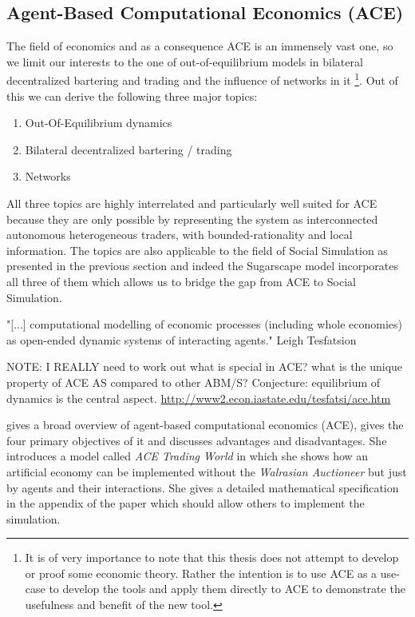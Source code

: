 \subsection{Agent-Based Computational Economics (ACE)}
The field of economics and as a consequence ACE is an immensely vast one, so we limit our interests to the one of out-of-equilibrium models in bilateral decentralized bartering and trading and the influence of networks in it \footnote{It is of very importance to note that this thesis does not attempt to develop or proof some economic theory. Rather the intention is to use ACE as a use-case to develop the tools and apply them directly to ACE to demonstrate the usefulness and benefit of the new tool.}. Out of this we can derive the following three major topics:

\begin{enumerate}
	\item Out-Of-Equilibrium dynamics
	\item Bilateral decentralized bartering / trading
	\item Networks
\end{enumerate}

All three topics are highly interrelated and particularly well suited for ACE because they are only possible by representing the system as interconnected autonomous heterogeneous traders, with bounded-rationality and local information. The topics are also applicable to the field of Social Simulation as presented in the previous section and indeed the Sugarscape model incorporates all three of them which allows us to bridge the gap from ACE to Social Simulation.

"[...] computational modelling of economic processes (including whole economies) as open-ended dynamic systems of interacting agents." Leigh Tesfatsion

NOTE: I REALLY need to work out what is special in ACE? what is the unique property of ACE AS compared to other ABM/S? Conjecture: equilibrium of dynamics is the central aspect.
\url{http://www2.econ.iastate.edu/tesfatsi/ace.htm}

\cite{tesfatsion_agent-based_2006} gives a broad overview of agent-based computational economics (ACE), gives the four primary objectives of it and discusses advantages and disadvantages. She introduces a model called \textit{ACE Trading World} in which she shows how an artificial economy can be implemented without the \textit{Walrasian Auctioneer} but just by agents and their interactions. She gives a detailed mathematical specification in the appendix of the paper which should allow others to implement the simulation.

